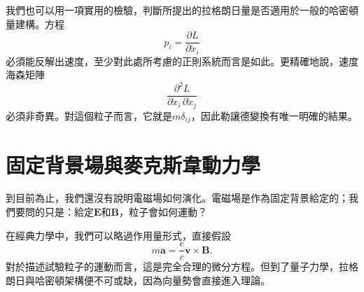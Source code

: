 我們也可以用一項實用的檢驗，判斷所提出的拉格朗日量是否適用於一般的哈密頓量建構。方程
\begin{equation}
  p_i=\frac{\partial L}{\partial\dot x_i}
\end{equation}
必須能反解出速度，至少對此處所考慮的正則系統而言是如此。更精確地說，速度海森矩陣
\begin{equation}
  \frac{\partial^2L}
       {\partial\dot x_i\,\partial\dot x_j}
\end{equation}
必須非奇異。對這個粒子而言，它就是\(m\delta_{ij}\)，因此勒讓德變換有唯一明確的結果。

\begin{classroomqa}
\end{classroomqa}

\begin{classroomqa}
\end{classroomqa}

\section{固定背景場與麥克斯韋動力學}

到目前為止，我們還沒有說明電磁場如何演化。電磁場是作為固定背景給定的；我們要問的只是：給定\(\mathbf E\)和\(\mathbf B\)，粒子會如何運動？

\begin{classroomqa}
\end{classroomqa}

在經典力學中，我們可以略過作用量形式，直接假設
\begin{equation}
  m\mathbf a=\frac{e}{c}\mathbf v\times\mathbf B.
\end{equation}
對於描述試驗粒子的運動而言，這是完全合理的微分方程。但到了量子力學，拉格朗日與哈密頓架構便不可或缺，因為向量勢會直接進入理論。

